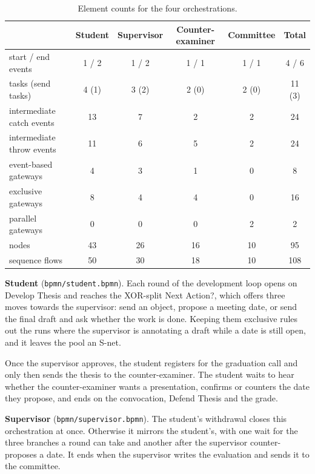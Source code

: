 \begin{table}[!h]
  \centering
  \vspace{2em}
  \renewcommand{\arraystretch}{1.08}
  \begin{tabular}{@{}l ccccc@{}}
    \toprule
    & \textbf{Student} & \textbf{Supervisor} & \textbf{Counter-examiner} & \textbf{Committee} & \textbf{Total} \\
    \midrule
    start / end events & 1 / 2 & 1 / 2 & 1 / 1 & 1 / 1 & 4 / 6 \\
    tasks (send tasks) & 4 (1) & 3 (2) & 2 (0) & 2 (0) & 11 (3) \\
    intermediate catch events & 13 & 7 & 2 & 2 & 24 \\
    intermediate throw events & 11 & 6 & 5 & 2 & 24 \\
    event-based gateways & 4 & 3 & 1 & 0 & 8 \\
    exclusive gateways & 8 & 4 & 4 & 0 & 16 \\
    parallel gateways & 0 & 0 & 0 & 2 & 2 \\
    \midrule
    nodes & 43 & 26 & 16 & 10 & 95 \\
    sequence flows & 50 & 30 & 18 & 10 & 108 \\
    \bottomrule
  \end{tabular}
  \caption{Element counts for the four orchestrations.}
  \label{tab:elements}
\end{table}
\textbf{Student} (\texttt{bpmn/student.bpmn}). Each round of the development loop opens on \textsf{Develop Thesis} and reaches the XOR-split \textsf{Next Action?}, which offers three moves towards the supervisor: send an object, propose a meeting date, or send the final draft and ask whether the work is done. Keeping them exclusive rules out the runs where the supervisor is annotating a draft while a date is still open, and it leaves the pool an S-net.

Once the supervisor approves, the student registers for the graduation call and only then sends the thesis to the counter-examiner. The student waits to hear whether the counter-examiner wants a presentation, confirms or counters the date they propose, and ends on the convocation, \textsf{Defend Thesis} and the grade.

\textbf{Supervisor} (\texttt{bpmn/supervisor.bpmn}). The student's withdrawal closes this orchestration at once. Otherwise it mirrors the student's, with one wait for the three branches a round can take and another after the supervisor counter-proposes a date. It ends when the supervisor writes the evaluation and sends it to the committee.

